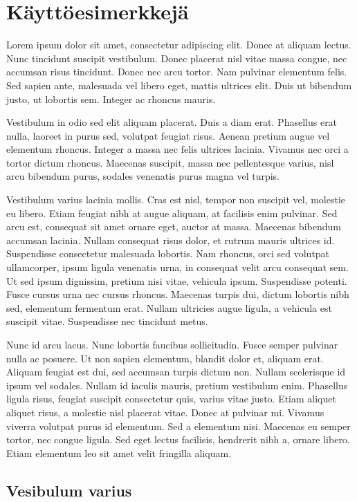 \chapter{Käyttöesimerkkejä}
Lorem ipsum dolor sit amet, consectetur adipiscing elit. Donec at aliquam lectus. Nunc tincidunt suscipit vestibulum. Donec placerat nisl vitae massa congue, nec accumsan risus tincidunt. Donec nec arcu tortor. Nam pulvinar elementum felis. Sed sapien ante, malesuada vel libero eget, mattis ultrices elit. Duis ut bibendum justo, ut lobortis sem. Integer ac rhoncus mauris.

Vestibulum in odio sed elit aliquam placerat. Duis a diam erat. Phasellus erat nulla, laoreet in purus sed, volutpat feugiat risus. Aenean pretium augue vel elementum rhoncus. Integer a massa nec felis ultrices lacinia. Vivamus nec orci a tortor dictum rhoncus. Maecenas suscipit, massa nec pellentesque varius, nisl arcu bibendum purus, sodales venenatis purus magna vel turpis.

Vestibulum varius lacinia mollis. Cras est nisl, tempor non suscipit vel, molestie eu libero. Etiam feugiat nibh at augue aliquam, at facilisis enim pulvinar. Sed arcu est, consequat sit amet ornare eget, auctor at massa. Maecenas bibendum accumsan lacinia. Nullam consequat risus dolor, et rutrum mauris ultrices id. Suspendisse consectetur malesuada lobortis. Nam rhoncus, orci sed volutpat ullamcorper, ipsum ligula venenatis urna, in consequat velit arcu consequat sem. Ut sed ipsum dignissim, pretium nisi vitae, vehicula ipsum. Suspendisse potenti. Fusce cursus urna nec cursus rhoncus. Maecenas turpis dui, dictum lobortis nibh sed, elementum fermentum erat. Nullam ultricies augue ligula, a vehicula est suscipit vitae. Suspendisse nec tincidunt metus.

Nunc id arcu lacus. Nunc lobortis faucibus sollicitudin. Fusce semper pulvinar nulla ac posuere. Ut non sapien elementum, blandit dolor et, aliquam erat. Aliquam feugiat est dui, sed accumsan turpis dictum non. Nullam scelerisque id ipsum vel sodales. Nullam id iaculis mauris, pretium vestibulum enim. Phasellus ligula risus, feugiat suscipit consectetur quis, varius vitae justo. Etiam aliquet aliquet risus, a molestie nisl placerat vitae. Donec at pulvinar mi. Vivamus viverra volutpat purus id elementum. Sed a elementum nisi. Maecenas eu semper tortor, nec congue ligula. Sed eget lectus facilisis, hendrerit nibh a, ornare libero. Etiam elementum leo sit amet velit fringilla aliquam.

\section{Vesibulum varius}


